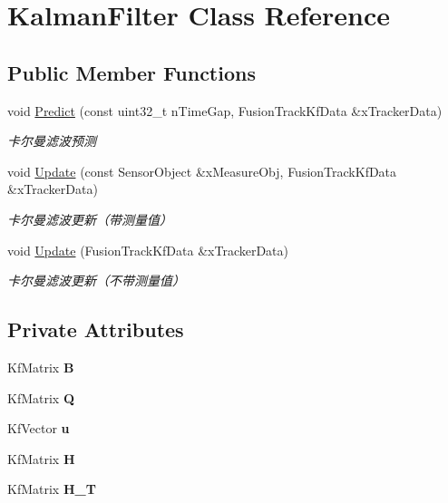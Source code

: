 \hypertarget{classKalmanFilter}{}\section{Kalman\+Filter Class Reference}
\label{classKalmanFilter}
\subsection*{Public Member Functions}
\begin{DoxyCompactItemize}
\item 
void \hyperlink{classKalmanFilter_a9c2e4175624640575fd1d0148eaef943}{Predict} (const uint32\+\_\+t n\+Time\+Gap, Fusion\+Track\+Kf\+Data \&x\+Tracker\+Data)
\begin{DoxyCompactList}\small\item\em 卡尔曼滤波预测 \end{DoxyCompactList}\item 
void \hyperlink{classKalmanFilter_a15ba39687fe9374e6f129923dde63c8a}{Update} (const Sensor\+Object \&x\+Measure\+Obj, Fusion\+Track\+Kf\+Data \&x\+Tracker\+Data)
\begin{DoxyCompactList}\small\item\em 卡尔曼滤波更新（带测量值） \end{DoxyCompactList}\item 
void \hyperlink{classKalmanFilter_a6732a1548fd88786a44edd76854913b2}{Update} (Fusion\+Track\+Kf\+Data \&x\+Tracker\+Data)
\begin{DoxyCompactList}\small\item\em 卡尔曼滤波更新（不带测量值） \end{DoxyCompactList}\end{DoxyCompactItemize}
\subsection*{Private Attributes}
\begin{DoxyCompactItemize}
\item 
\mbox{\label{classKalmanFilter_ace6e5df8d84cf4d282dea04d09bae532}} 
Kf\+Matrix {\bfseries B}
\item 
\mbox{\label{classKalmanFilter_a3527ccf295e0b72d39dfb9ae7e0c4415}} 
Kf\+Matrix {\bfseries Q}
\item 
\mbox{\label{classKalmanFilter_aa75c2b64a7552fa19012defbbd4feeaa}} 
Kf\+Vector {\bfseries u}
\item 
\mbox{\label{classKalmanFilter_a14821e11ca44c685b2bb9890da76498f}} 
Kf\+Matrix {\bfseries H}
\item 
\mbox{\label{classKalmanFilter_a36a58d0f74271c121ea1dd08905104d4}} 
Kf\+Matrix {\bfseries H\+\_\+T}
\end{DoxyCompactItemize}


